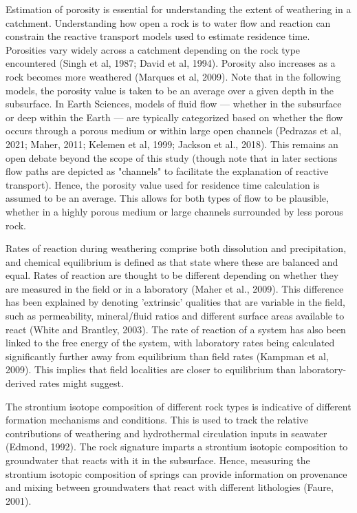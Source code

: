 Estimation of porosity is essential for understanding the extent of weathering in a catchment. Understanding how open a rock is to water flow and reaction can constrain the reactive transport models used to estimate residence time. Porosities vary widely across a catchment depending on the rock type encountered (Singh et al, 1987; David et al, 1994). Porosity also increases as a rock becomes more weathered (Marques et al, 2009). Note that in the following models, the porosity value is taken to be an average over a given depth in the subsurface. In Earth Sciences, models of fluid flow — whether in the subsurface or deep within the Earth — are typically categorized based on whether the flow occurs through a porous medium or within large open channels (Pedrazas et al, 2021; Maher, 2011; Kelemen et al, 1999; Jackson et al., 2018). This remains an open debate beyond the scope of this study (though note that in later sections flow paths are depicted as "channels" to facilitate the explanation of reactive transport). Hence, the porosity value used for residence time calculation is assumed to be an average. This allows for both types of flow to be plausible, whether in a highly porous medium or large channels surrounded by less porous rock.


\bsk

Rates of reaction during weathering comprise both dissolution and precipitation, and chemical equilibrium is defined as that state where these are balanced and equal. Rates of reaction are thought to be different depending on whether they are measured in the field or in a laboratory (Maher et al., 2009). This difference has been explained by denoting 'extrinsic' qualities that are variable in the field, such as permeability, mineral/fluid ratios and different surface areas available to react (White and Brantley, 2003). The rate of reaction of a system has also been linked to the free energy of the system, with laboratory rates being calculated significantly further away from equilibrium than field rates (Kampman et al, 2009). This implies that field localities are closer to equilibrium than laboratory-derived rates might suggest. 

\bsk

The strontium isotope composition of different rock types is indicative of different formation mechanisms and conditions. This is used to track the relative contributions of weathering and hydrothermal circulation inputs in seawater (Edmond, 1992). The rock signature imparts a strontium isotopic composition to groundwater that reacts with it in the subsurface. Hence, measuring the strontium isotopic composition of springs can provide information on provenance and mixing between groundwaters that react with different lithologies (Faure, 2001).

